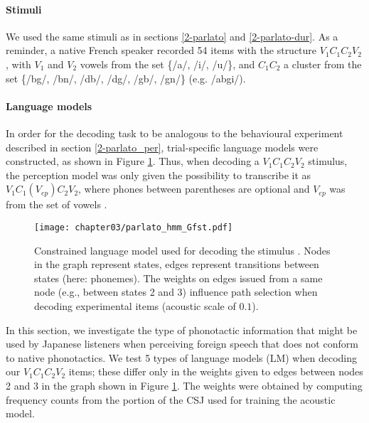 \paragraph{Stimuli}
We used the same stimuli as in sections \ref{2-parlato} and \ref{2-parlato-dur}. As a reminder, a native French speaker recorded 54 items with the structure $V_{1}C_{1}C_{2}V_{2}$, with $V_{1}$ and $V_{2}$ vowels from the set \{/a/, /i/, /u/\}, and $C_{1}C_{2}$ a cluster from the set \{/bg/, /bn/, /db/, /dg/, /gb/, /gn/\} (e.g. /abgi/).

\paragraph{Language models}
In order for the decoding task to be analogous to the behavioural experiment described in section \ref{2-parlato_per}, trial-specific language models were constructed, as shown in Figure \ref{fig:parlato_G}. Thus, when decoding a $V_{1}C_{1}C_{2}V_{2}$ stimulus, the perception model was only given the possibility to transcribe it as $V_{1}C_{1}(V_{ep})C_{2}V_{2}$, where phones between parentheses are optional and $V_{ep}$ was from the set of vowels . 

\begin{figure}[htb]
\centering
\texttt{[image: chapter03/parlato\_hmm\_Gfst.pdf]}
\caption{Constrained language model used for decoding the stimulus . Nodes in the graph represent states, edges represent transitions between states (here: phonemes). The weights on edges issued from a same node (e.g., between states 2 and 3) influence path selection when decoding experimental items (acoustic scale of $0.1$).}
\label{fig:parlato_G}
\end{figure}

In this section, we investigate the type of phonotactic information that might be used by Japanese listeners when perceiving foreign speech that does not conform to native phonotactics. We test 5 types of language models (LM) when decoding our $V_{1}C_{1}C_{2}V_{2}$ items; these differ only in the weights given to edges between nodes 2 and 3 in the graph shown in Figure \ref{fig:parlato_G}. The weights were obtained by computing frequency counts from the portion of the CSJ used for training the acoustic model.


